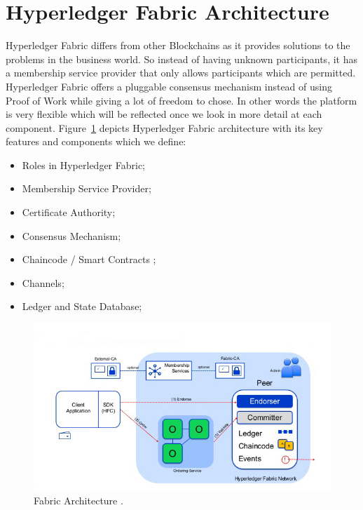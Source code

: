 \section{Hyperledger Fabric Architecture}
Hyperledger Fabric differs from other Blockchains as it provides solutions to the problems in the business world. So instead of having unknown participants, it has a membership service provider that only allows participants which are permitted. Hyperledger Fabric offers a pluggable consensus mechanism instead of using Proof of Work while giving a lot of freedom to chose. In other words the platform is very  flexible which will be reflected once we look in more detail at each component. Figure~\ref{fig:fabric_arch} depicts Hyperledger Fabric architecture with its key features and components which we define:
\begin{itemize}
    \item Roles in Hyperledger Fabric;
     \item Membership Service Provider;
     \item Certificate Authority;
    \item Consensus Mechanism;
    \item Chaincode / Smart Contracts ;
    \item Channels;
    \item Ledger and State Database;
\end{itemize}
\begin{figure}[!htb]
    \centering
    \includegraphics[width=1\textwidth]{figures/HyperledgerArchitecture.jpg}
    \caption{Fabric Architecture \cite{technical-dive}.}
    \label{fig:fabric_arch}
\end{figure}

